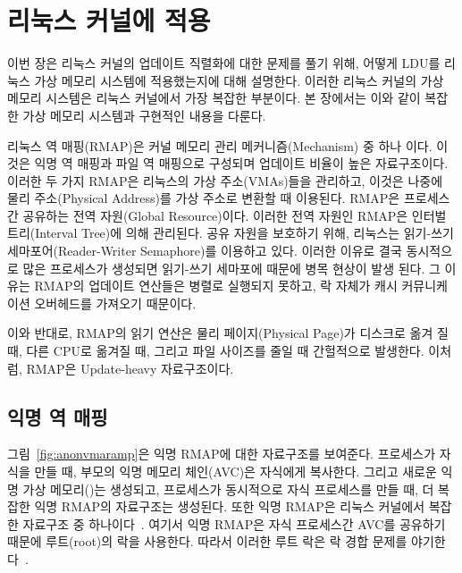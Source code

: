 \newpage
\section{리눅스 커널에 적용}
\label{sec:linux}

이번 장은 리눅스 커널의 업데이트 직렬화에 대한 문제를 풀기 위해,
어떻게 LDU를 리눅스 가상 메모리 시스템에 적용했는지에 대해 설명한다.
이러한 리눅스 커널의 가상 메모리 시스템은 리눅스 커널에서 가장 복잡한 부분이다.
본 장에서는 이와 같이 복잡한 가상 메모리 시스템과 구현적인 내용을 다룬다.

리눅스 역 매핑(RMAP)은 커널 메모리 관리 메커니즘(Mechanism) 중 하나 이다.
이것은 익명 역 매핑과 파일 역 매핑으로 구성되며 업데이트 비율이 높은 자료구조이다.
이러한 두 가지 RMAP은 리눅스의 가상 주소(VMAs)들을 관리하고, 이것은 나중에 물리 주소(Physical Address)를 
가상 주소로 변환할 때 이용된다.
RMAP은 프로세스 간 공유하는 전역 자원(Global Resource)이다.
이러한 전역 자원인 RMAP은 인터벌 트리(Interval Tree)에 의해 관리된다.
공유 자원을 보호하기 위해, 리눅스는 읽기-쓰기 세마포어(Reader-Writer Semaphore)를 이용하고 있다.
이러한 이유로 결국 동시적으로 많은 프로세스가 생성되면 읽기-쓰기 세마포에 때문에 병목 현상이 발생 된다.
그 이유는 RMAP의 업데이트 연산들은 병렬로 실행되지 못하고, 
락 자체가 캐시 커뮤니케이션 오버헤드를 가져오기 때문이다.

이와 반대로, RMAP의 읽기 연산은 물리 페이지(Physical Page)가 디스크로 옮겨 질 때, 다른 CPU로 옮겨질 때, 그리고 
파일 사이즈를 줄일 때 간헐적으로 발생한다. 
이처럼, RMAP은 Update-heavy 자료구조이다.

\subsection{익명 역 매핑}


그림~\ref{fig:anonvmaramp}은 익명 RMAP에 대한 자료구조를 보여준다.
프로세스가 자식을 만들 때, 부모의 익명 메모리 체인(AVC)은 자식에게 복사한다. 
그리고 새로운 익명 가상 메모리()는 생성되고,
프로세스가 동시적으로 자식 프로세스를 만들 때, 더 복잡한 익명 RMAP의 자료구조는 생성된다.
또한 익명 RMAP은 리눅스 커널에서 복잡한 자료구조 중 하나이다~\cite{CorbetLWNANON}.
여기서 익명 RMAP은 자식 프로세스간 AVC를 공유하기 때문에 루트(root)의 락을 사용한다.
따라서 이러한 루트 락은 락 경합 문제를 야기한다~\cite{Andi2011adding}.  


